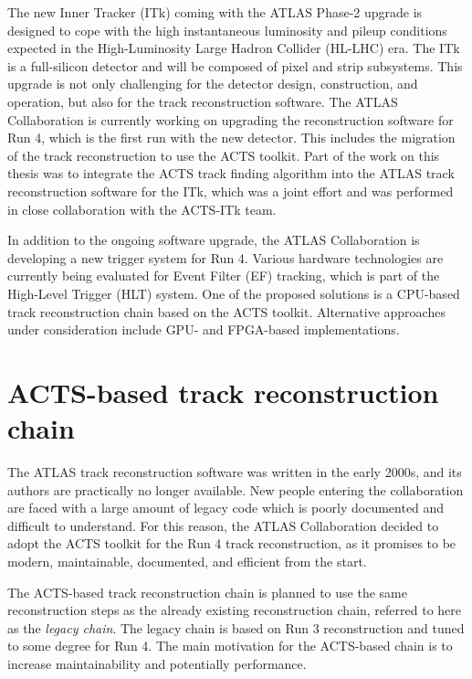 The new Inner Tracker (ITk) coming with the ATLAS Phase-2 upgrade is designed to cope with the high instantaneous luminosity and pileup conditions expected in the High-Luminosity Large Hadron Collider (HL-LHC) era. The ITk is a full-silicon detector and will be composed of pixel \cite{itk-pixel-tdr} and strip \cite{itk-strip-tdr} subsystems. This upgrade is not only challenging for the detector design, construction, and operation, but also for the track reconstruction software. The ATLAS Collaboration is currently working on upgrading the reconstruction software for Run 4, which is the first run with the new detector. This includes the migration of the track reconstruction to use the ACTS toolkit. Part of the work on this thesis was to integrate the ACTS track finding algorithm into the ATLAS track reconstruction software for the ITk, which was a joint effort and was performed in close collaboration with the ACTS-ITk team.

In addition to the ongoing software upgrade, the ATLAS Collaboration is developing a new trigger system for Run 4. Various hardware technologies are currently being evaluated for Event Filter (EF) tracking, which is part of the High-Level Trigger (HLT) system. One of the proposed solutions is a CPU-based track reconstruction chain based on the ACTS toolkit. Alternative approaches under consideration include GPU- and FPGA-based implementations.

\section{ACTS-based track reconstruction chain}

The ATLAS track reconstruction software was written in the early 2000s, and its authors are practically no longer available. New people entering the collaboration are faced with a large amount of legacy code which is poorly documented and difficult to understand. For this reason, the ATLAS Collaboration decided to adopt the ACTS toolkit for the Run 4 track reconstruction, as it promises to be modern, maintainable, documented, and efficient from the start.

The ACTS-based track reconstruction chain is planned to use the same reconstruction steps as the already existing reconstruction chain, referred to here as the \textit{legacy chain}. The legacy chain is based on Run 3 reconstruction \cite{atlas-sac-run3} and tuned to some degree for Run 4. The main motivation for the ACTS-based chain is to increase maintainability and potentially performance.

